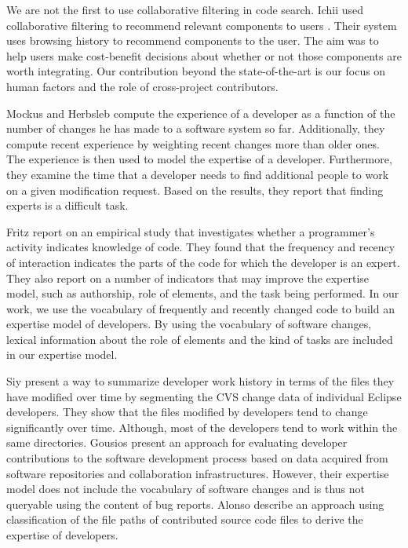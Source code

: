 We are not the first to use collaborative filtering in code search. Ichii \etal used collaborative filtering to recommend relevant components to users \cite{Ichi09a}. Their system uses browsing history to recommend components to the user. The aim was to help users make cost-benefit decisions about whether or not those components are worth integrating. Our contribution beyond the state-of-the-art is our focus on human factors and the role of cross-project contributors.

Mockus and Herbsleb \cite{Mock02b} compute the experience of a developer as a function of the number of changes he has made to a software system so far. Additionally, they compute recent experience by weighting recent changes more than older ones. The experience is then used to model the expertise of a developer. Furthermore, they examine the time that a developer needs to find additional people to work on a given modification request. Based on the results, they report that finding experts is a difficult task.

Fritz \etal \cite{Frit07a} report on an empirical study that investigates whether a programmer's activity indicates knowledge of code. They found that the frequency and recency of interaction  indicates the parts of the code for which the developer is an expert. They also report on a number of indicators that may improve the expertise model, such as authorship, role of elements, and the task being performed. In our work, we use the vocabulary of frequently and recently changed code to build an expertise model of developers. By using the vocabulary of software changes, lexical information about the role of elements and the kind of tasks are included in our expertise model.

Siy \etal \cite{Siy08a} present a way to summarize developer work history in terms of the files they have modified over time by segmenting the CVS change data of individual Eclipse developers. They show that the files modified by developers tend to change significantly over time. Although, most of the developers tend to work within the same directories. 
%
Gousios \etal \cite{Gous08a} present an approach for evaluating developer contributions to the software development process based on data acquired from software repositories and collaboration infrastructures. However, their expertise model does not include the vocabulary of software changes and is thus not queryable using the content of bug reports.
%
Alonso \etal \cite{Alon08a} describe an approach using classification of the file paths of contributed source code files to derive the expertise of developers. 

